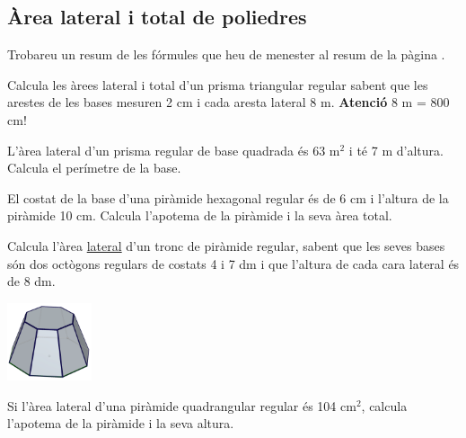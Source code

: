 \subsection{Àrea lateral i total de poliedres}

\begin{theorybox}
	Trobareu un resum de les fórmules que heu de menester al resum de la pàgina \pageref{sec:resum11}.
\end{theorybox}

\begin{mylist}
	
\exer Calcula les àrees lateral i total d'un prisma triangular regular sabent que les arestes de les bases mesuren 2 cm i cada aresta lateral 8 m. \textbf{Atenció} 8 m = 800 cm!

\exer  L'àrea lateral d'un prisma regular de base quadrada és 63 m${}^{2}$ i té 7 m d'altura. Calcula el perímetre de la base.

\exer  El costat de la base d'una piràmide hexagonal regular és de 6 cm i l'altura de la piràmide 10 cm. Calcula l'apotema de la piràmide i la seva àrea total.

\vspace{-1cm}
\exer[1]  \begin{minipage}[t]{0.7\textwidth} Calcula l'àrea \underline{lateral} d'un tronc de piràmide regular, sabent que les seves bases són dos octògons regulars de costats 4 i 7 dm i que l'altura de cada cara lateral és de 8 dm. 
\end{minipage}
\begin{minipage}{0.25\textwidth}
	\vspace{1cm}
	\centering
\includegraphics*[width=2.5cm]{img-11/tronc-octogon.png}
\end{minipage}

\exer[1]  \hot Si l'àrea lateral d'una piràmide quadrangular regular és 104 cm${}^{2}$, calcula l'apotema de la piràmide i la seva altura.
 
\end{mylist}


